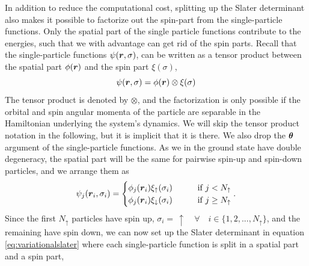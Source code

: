 In addition to reduce the computational cost, splitting up the Slater determinant also makes it possible to factorize out the spin-part from the single-particle functions. Only the spatial part of the single particle functions contribute to the energies, such that we with advantage can get rid of the spin parts. Recall that the single-particle functions $\psi(\boldsymbol{{r}},\sigma)$, can be written as a tensor product between the spatial part $\phi(\boldsymbol{{r}})$ and the spin part $\xi(\sigma)$, 
\begin{equation}
\psi(\boldsymbol{{r}},\sigma)=\phi(\boldsymbol{{r}})\otimes\xi(\sigma) 
\end{equation}
\fi
The tensor product is denoted by $\otimes$, and the factorization is only possible if the orbital and spin angular momenta of the particle are separable in the Hamiltonian underlying the system's dynamics. We will skip the tensor product notation in the following, but it is implicit that it is there. We also drop the $\boldsymbol{{\theta}}$ argument of the single-particle functions. As we in the ground state have double degeneracy, the spatial part will be the same for pairwise spin-up and spin-down particles, and we arrange them as
\begin{equation}
\psi_j(\boldsymbol{{r}}_i,\sigma_i)=
\begin{cases}
\phi_j(\boldsymbol{{r}}_i)\xi_{\uparrow}(\sigma_i)\quad\quad&\text{if } j<N_{\uparrow}\\
\phi_j(\boldsymbol{{r}}_i)\xi_{\downarrow}(\sigma_i)\quad\quad&\text{if } j\geq N_{\uparrow}
\end{cases}.
\end{equation}
Since the first $N_{\uparrow}$ particles have spin up, $\sigma_i=\,\uparrow\quad\forall\quad i\in\{1,2,...,N_{\uparrow}\}$, and the remaining have spin down, we can now set up the Slater determinant in equation \eqref{eq:variationalslater} where each single-particle function is split in a spatial part and a spin part,
